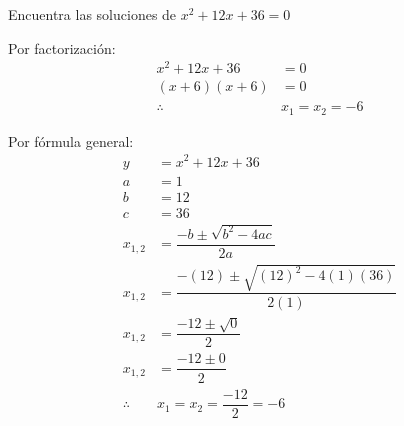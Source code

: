 Encuentra las soluciones de $x^2+12x+36=0$

\begin{solutionbox}{12cm}
    \begin{multicols}{2}
        Por factorización:
        \begin{align*}
            x^2+12x+36 & = 0          \\
            (x+6)(x+6) & = 0          \\
            \therefore & x_1 =x_2 =-6
        \end{align*}

        \columnbreak

        Por fórmula general:
        \begin{align*}
            y          & =	      x^2+12x+36
            \\
            a          & =1
            \\
            b          & =12
            \\
            c          & =36
            \\
            x_{1,2}    & = \dfrac{-b\pm\sqrt{b^2-4ac}}{2a}
            \\[2em]
            x_{1,2}    & = \dfrac{-(12)\pm\sqrt{(12)^2-4(1)(36)}}{2(1)}
            \\[2em]
            x_{1,2}    & = \dfrac{-12\pm\sqrt{0}}{2}
            \\[2em]
            x_{1,2}    & = \dfrac{-12\pm 0}{2}
            \\[2em]
            \therefore & x_1 =x_2=\dfrac{-12}{2}=-6
        \end{align*}
    \end{multicols}
\end{solutionbox}
